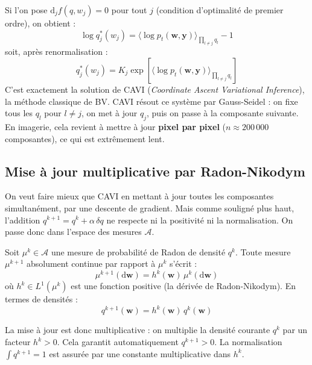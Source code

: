 \documentclass[12pt]{article}
\newcommand{\w}{\boldsymbol{w}}
\newcommand{\y}{\boldsymbol{y}}
\begin{document}
\begin{remarkbox}
Si l'on pose $\mathrm{d}_j f(q, w_j) = 0$ pour tout $j$ (condition d'optimalité de premier ordre), on obtient 
:
\[
\log q_j^*(w_j) = \langle \log p_t(\w, \y) \rangle_{\prod_{l \neq j} q_l} - 1
\]
soit, après renormalisation 
:
\begin{equation}
    q_j^*(w_j) = K_j \exp\!\left[\langle \log p_t(\w, \y) \rangle_{\prod_{l \neq j} q_l}\right]
\end{equation}
C'est exactement la solution de CAVI (\textit{Coordinate Ascent Variational Inference}), la méthode classique de BV. CAVI résout ce système par Gauss-Seidel 
: on fixe tous les $q_l$ pour $l \neq j$, on met à jour $q_j$, puis on passe à la composante suivante. En imagerie, cela revient à mettre à jour \textbf{pixel par pixel} ($n \approx 200\,000$ composantes), ce qui est extrêmement lent.
\end{remarkbox}


\subsection{Mise à jour multiplicative par Radon-Nikodym}

On veut faire mieux que CAVI en mettant à jour toutes les composantes simultanément, par une descente de gradient. Mais comme souligné plus haut, l'addition $q^{k+1} = q^k + \alpha\, \delta q$ ne respecte ni la positivité ni la normalisation. On passe donc dans l'espace des mesures $\mathcal{A}$.

\begin{theorembox}
\label{thm:radon_nikodym}
Soit $\mu^k \in \mathcal{A}$ une mesure de probabilité de Radon de densité $q^k$. Toute mesure $\mu^{k+1}$ absolument continue par rapport à $\mu^k$ s'écrit 
:
\begin{equation}
    \mu^{k+1}(\mathrm{d}\w) = h^k(\w)\, \mu^k(\mathrm{d}\w)
\end{equation}
où $h^k \in L^1(\mu^k)$ est une fonction positive (la dérivée de Radon-Nikodym). En termes de densités 
:
\begin{equation}
    \boxed{q^{k+1}(\w) = h^k(\w)\, q^k(\w)}
    \label{eq:multiplicative_update}
\end{equation}
\end{theorembox}

La mise à jour est donc multiplicative 
: on multiplie la densité courante $q^k$ par un facteur $h^k > 0$. Cela garantit automatiquement $q^{k+1} > 0$. La normalisation $\int q^{k+1} = 1$ est assurée par une constante multiplicative dans $h^k$.
\end{document}

